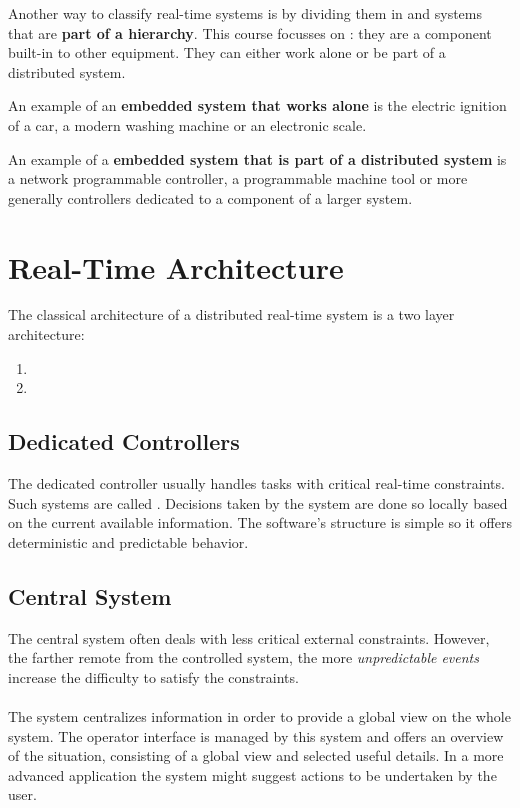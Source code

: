 Another way to classify real-time systems is by dividing them in  and systems that are \textbf{part of a hierarchy}. This course focusses on : they are a component built-in to other equipment. They can either work alone or be part of a distributed system.

\begin{exmp}
An example of an \textbf{embedded system that works alone} is the electric ignition of a car, a modern washing machine or an electronic scale.
\end{exmp} 

\begin{exmp}
An example of a \textbf{embedded system that is part of a distributed system} is a network programmable controller, a programmable machine tool or more generally controllers dedicated to a component of a larger system.
\end{exmp} 


\section{Real-Time Architecture}
The classical architecture of a distributed real-time system is a two layer architecture:
\begin{enumerate}
	\item {} 
	\item {}
\end{enumerate}

\subsection{Dedicated Controllers}
The dedicated controller usually handles tasks with critical real-time constraints. Such systems are called . Decisions taken by the system are done so locally based on the current available information. The software's structure is simple so it offers deterministic and predictable behavior. 
 
\subsection{Central System}
The central system often deals with less critical external constraints. However, the farther remote from the controlled system, the more \textit{unpredictable events} increase the difficulty to satisfy the constraints. 
\\\\
The system centralizes information in order to provide a global view on the whole system. The operator interface is managed by this system and offers an overview of the situation, consisting of a global view and selected useful details. In a more advanced application the system might suggest actions to be undertaken by the user.

